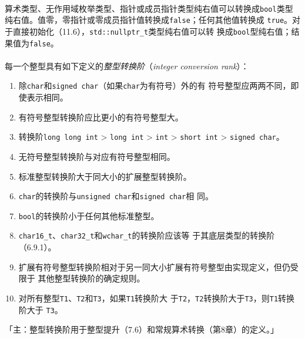 \paragraph{}
算术类型、无作用域枚举类型、指针或成员指针类型纯右值可以转换成\texttt{bool}类型
纯右值。值零，零指针或零成员指针值转换成\texttt{false}；任何其他值转换成
\texttt{true}。对于直接初始化（11.6），\texttt{std::nullptr\_t}类型纯右值可以转
换成\texttt{bool}型纯右值；结果值为\texttt{false}。

\paragraph{}
每一个整型具有如下定义的\textit{整型转换阶}（\textit{integer conversion rank}）：
\begin{enumerate}
  \item{除\texttt{char}和\texttt{signed char}（如果\texttt{char}为有符号）外的有
    符号整型应两两不同，即使表示相同。}
  \item{有符号整型转换阶应比更小的有符号整型大。}
  \item{转换阶\texttt{long long int} > \texttt{long int} > \texttt{int} >
    \texttt{short int} > \texttt{signed char}。}
  \item{无符号整型转换阶与对应有符号整型相同。}
  \item{标准整型转换阶大于同大小的扩展整型转换阶。}
  \item{\texttt{char}的转换阶与\texttt{unsigned char}和\texttt{signed char}相
    同。}
  \item{\texttt{bool}的转换阶小于任何其他标准整型。}
  \item{\texttt{char16\_t}、\texttt{char32\_t}和\texttt{wchar\_t}的转换阶应该等
    于其底层类型的转换阶（6.9.1）。}
  \item{扩展有符号整型转换阶相对于另一同大小扩展有符号整型由实现定义，但仍受限于
    其他整型转换阶的确定规则。}
  \item{对所有整型\texttt{T1}、\texttt{T2}和\texttt{T3}，如果\texttt{T1}转换阶大
    于\texttt{T2}，\texttt{T2}转换阶大于\texttt{T3}，则\texttt{T1}转换阶大于
    \texttt{T3}。}
\end{enumerate}
「主：整型转换阶用于整型提升（7.6）和常规算术转换（第8章）的定义。」
